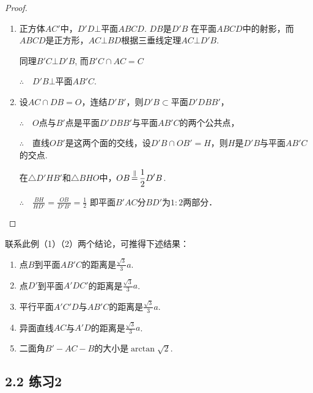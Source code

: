 \begin{proof}
\begin{enumerate}[(1)]
    \item 正方体$AC'$中，$D'D\bot $平面$ABCD$. $DB$是$D'B$
    在平面$ABCD$中的射影，而$ABCD$是正方形，$AC\bot BD$根据三垂线定理$AC\bot D'B$.

    同理$B'C\bot D'B$, 而$B'C\cap AC=C$ 
    
    $\therefore\quad D'B\bot $平面$AB'C$.
  \item 设$AC\cap DB=O$，连结$D'B'$，则$D'B\subset $平面$D'DBB'$，
  
  $\therefore\quad O$点与$B'$点是平面$D'DBB'$与平面$AB'C$的两个公共点，
  
  $\therefore\quad $直线$OB'$是这两个面的交线，设$D'B\cap OB'=H$，则$H$是$D'B$与平面$AB'C$的交点.

  在$\triangle D'HB'$和$\triangle BHO$中，$OB\displaystyle\mathop{=}^{\parallel} \dfrac{1}{2}D'B$.

$\therefore\quad  \frac{BH}{HD'}=\frac{OB}{D'B'}=\frac{1}{2}$
    即平面$B'AC$分$BD'$为$1:2$两部分．
\end{enumerate}
\end{proof}

\begin{remark}
联系此例（1）（2）两个结论，可推得下述结果：
\begin{enumerate}
\item 点$B$到平面$AB'C$的距离是$\frac{\sqrt{3}}{3}a$.
\item 点$D'$到平面$A'DC'$的距离是$\frac{\sqrt{3}}{3}a$.
\item 平行平面$A'C'D$与$AB'C$的距离是$\frac{\sqrt{3}}{3}a$.
\item 异面直线$AC$与$A'D$的距离是$\frac{\sqrt{3}}{3}a$.
\item 二面角$B'-AC-B$的大小是$\arctan\sqrt{2}$.
\end{enumerate}
\end{remark}

\subsection*{2.2 练习2}

